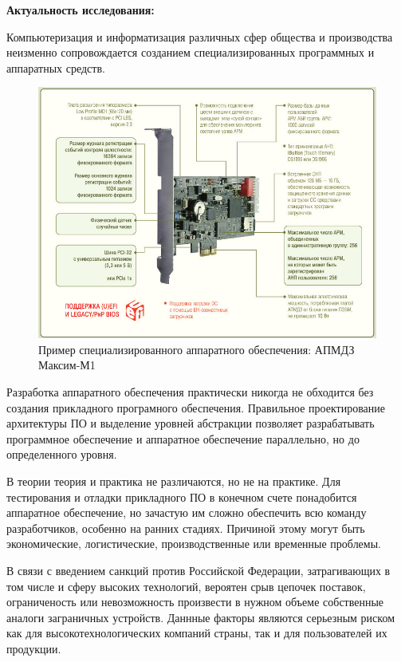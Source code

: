 \textbf{Актуальность исследования:}

Компьютеризация и информатизация различных сфер общества и производства неизменно
сопровождается созданием специализированных программных и аппаратных средств.

\begin{figure}[!htbp]
    \includegraphics[width=\textwidth,height=\textheight,keepaspectratio]{images/apmdz.png}
    \caption{Пример специализированного аппаратного обеспечения: АПМДЗ Максим-М1\label{fig:apmdz}}
\end{figure}

Разработка аппаратного обеспечения практически никогда не обходится без создания
прикладного програмного обеспечения.
Правильное проектирование архитектуры ПО и выделение уровней абстракции позволяет
разрабатывать программное обеспечение и аппаратное обеспечение параллельно, но
до определенного уровня.

В теории теория и практика не различаются, но не на практике.
Для тестирования и отладки прикладного ПО в конечном счете понадобится аппаратное обеспечение,
но зачастую им сложно обеспечить всю команду разработчиков, особенно на ранних стадиях.
Причиной этому могут быть экономические, логистические, производственные или временные проблемы.

В связи с введением санкций против Российской Федерации, затрагивающих
в том числе и сферу высоких технологий, вероятен срыв цепочек поставок,
ограниченость или невозможность произвести в нужном объеме собственные
аналоги заграничных устройств.
Даннные факторы являются серьезным риском как для высокотехнологических
компаний страны, так и для пользователей их продукции.


